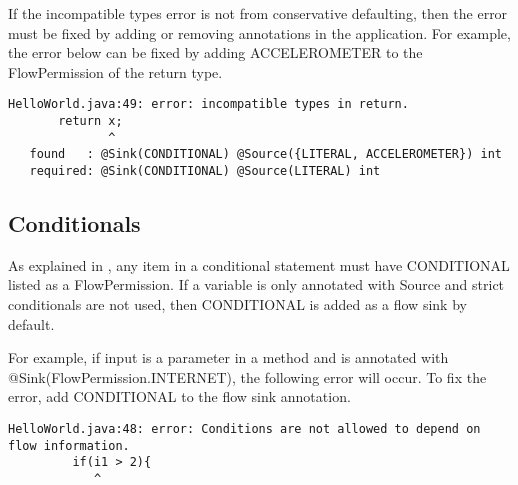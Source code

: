 If the incompatible types error is not from conservative defaulting, then the error must be fixed by adding or
removing annotations in the application.  For example, the error below can be fixed by adding ACCELEROMETER to the FlowPermission of the return type.  

\begin{Verbatim}
HelloWorld.java:49: error: incompatible types in return.
       return x;
              ^
   found   : @Sink(CONDITIONAL) @Source({LITERAL, ACCELEROMETER}) int
   required: @Sink(CONDITIONAL) @Source(LITERAL) int
\end{Verbatim}

\subsection{Conditionals}
As explained in , any item in a conditional statement must have CONDITIONAL listed as a FlowPermission.  If a variable is only annotated with Source and strict conditionals are not used, then CONDITIONAL is added as a flow sink by default. 

For example, if input is a parameter in a method and is annotated with @Sink(FlowPermission.INTERNET), the following error will occur.  To fix the error, add CONDITIONAL to the flow sink annotation.  

\begin{Verbatim}
HelloWorld.java:48: error: Conditions are not allowed to depend on flow information.
         if(i1 > 2){
            ^
\end{Verbatim}




